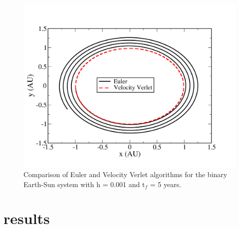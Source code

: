 \documentclass[prc,amsmath,twocolumn,superscriptaddress]{revtex4}
\begin{document}
\begin{figure}[b]
\includegraphics[scale=0.33]{binary.pdf}
\caption{Comparison of Euler and Velocity Verlet algorithms for the binary Earth-Sun system with h = 0.001 and t$_f$ = 5 years.}
\label{binary}
\end{figure}

\section{results}
\label{results}
\end{document}
